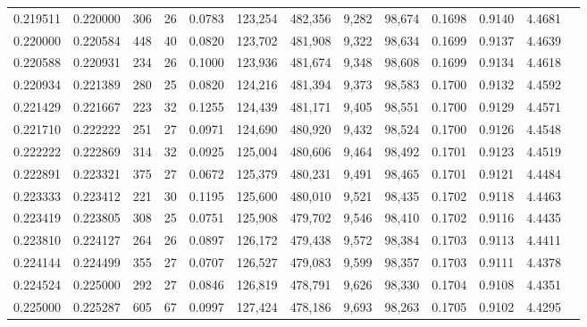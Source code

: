 \begin{tabular}{rrrrrrrrrrrrr}
0.219511 & 0.220000 &    306 &    26 &                                     0.0783 & 123,254 & 482,356 &   9,282 &  98,674 & 0.1698 & 0.9140 & 4.4681 \\
0.220000 & 0.220584 &    448 &    40 &                                     0.0820 & 123,702 & 481,908 &   9,322 &  98,634 & 0.1699 & 0.9137 & 4.4639 \\
0.220588 & 0.220931 &    234 &    26 &                                     0.1000 & 123,936 & 481,674 &   9,348 &  98,608 & 0.1699 & 0.9134 & 4.4618 \\
0.220934 & 0.221389 &    280 &    25 &                                     0.0820 & 124,216 & 481,394 &   9,373 &  98,583 & 0.1700 & 0.9132 & 4.4592 \\
0.221429 & 0.221667 &    223 &    32 &                                     0.1255 & 124,439 & 481,171 &   9,405 &  98,551 & 0.1700 & 0.9129 & 4.4571 \\
0.221710 & 0.222222 &    251 &    27 &                                     0.0971 & 124,690 & 480,920 &   9,432 &  98,524 & 0.1700 & 0.9126 & 4.4548 \\
0.222222 & 0.222869 &    314 &    32 &                                     0.0925 & 125,004 & 480,606 &   9,464 &  98,492 & 0.1701 & 0.9123 & 4.4519 \\
0.222891 & 0.223321 &    375 &    27 &                                     0.0672 & 125,379 & 480,231 &   9,491 &  98,465 & 0.1701 & 0.9121 & 4.4484 \\
0.223333 & 0.223412 &    221 &    30 &                                     0.1195 & 125,600 & 480,010 &   9,521 &  98,435 & 0.1702 & 0.9118 & 4.4463 \\
0.223419 & 0.223805 &    308 &    25 &                                     0.0751 & 125,908 & 479,702 &   9,546 &  98,410 & 0.1702 & 0.9116 & 4.4435 \\
0.223810 & 0.224127 &    264 &    26 &                                     0.0897 & 126,172 & 479,438 &   9,572 &  98,384 & 0.1703 & 0.9113 & 4.4411 \\
0.224144 & 0.224499 &    355 &    27 &                                     0.0707 & 126,527 & 479,083 &   9,599 &  98,357 & 0.1703 & 0.9111 & 4.4378 \\
0.224524 & 0.225000 &    292 &    27 &                                     0.0846 & 126,819 & 478,791 &   9,626 &  98,330 & 0.1704 & 0.9108 & 4.4351 \\
0.225000 & 0.225287 &    605 &    67 &                                     0.0997 & 127,424 & 478,186 &   9,693 &  98,263 & 0.1705 & 0.9102 & 4.4295 \\

\end{tabular}
